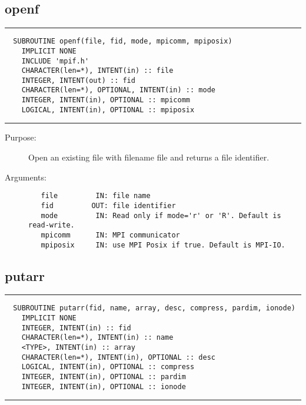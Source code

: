 \documentclass[a4paper]{article}
\begin{document}
\subsection{openf}

\par
\addvspace{\medskipamount}
\nopagebreak\hrule
\begin{verbatim}
  SUBROUTINE openf(file, fid, mode, mpicomm, mpiposix)
    IMPLICIT NONE
    INCLUDE 'mpif.h'
    CHARACTER(len=*), INTENT(in) :: file
    INTEGER, INTENT(out) :: fid
    CHARACTER(len=*), OPTIONAL, INTENT(in) :: mode
    INTEGER, INTENT(in), OPTIONAL :: mpicomm
    LOGICAL, INTENT(in), OPTIONAL :: mpiposix
\end{verbatim}
\nopagebreak\hrule
\addvspace{\medskipamount}

\begin{description}
\item[Purpose:] \mbox{}

Open an existing file with filename file and returns a file identifier.

\item[Arguments:] \mbox{}

\begin{verbatim}
   file         IN: file name
   fid         OUT: file identifier
   mode         IN: Read only if mode='r' or 'R'. Default is read-write.
   mpicomm      IN: MPI communicator
   mpiposix     IN: use MPI Posix if true. Default is MPI-IO.

\end{verbatim}


\end{description}





\subsection{putarr}

\par
\addvspace{\medskipamount}
\nopagebreak\hrule
\begin{verbatim}
  SUBROUTINE putarr(fid, name, array, desc, compress, pardim, ionode)
    IMPLICIT NONE
    INTEGER, INTENT(in) :: fid
    CHARACTER(len=*), INTENT(in) :: name
    <TYPE>, INTENT(in) :: array
    CHARACTER(len=*), INTENT(in), OPTIONAL :: desc
    LOGICAL, INTENT(in), OPTIONAL :: compress
    INTEGER, INTENT(in), OPTIONAL :: pardim
    INTEGER, INTENT(in), OPTIONAL :: ionode
\end{verbatim}
\nopagebreak\hrule
\addvspace{\medskipamount}
\end{document}
